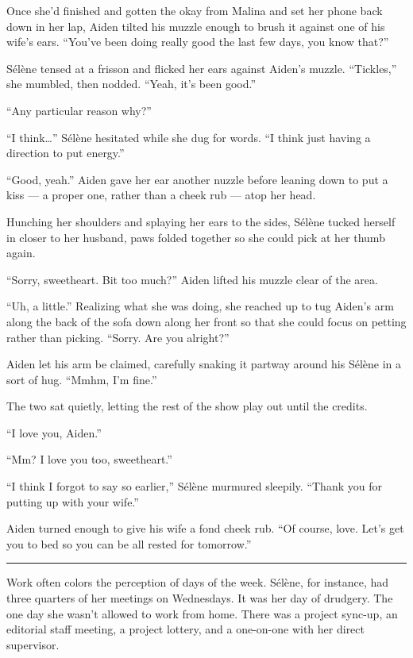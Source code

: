 Once she'd finished and gotten the okay from Malina and set her phone back down in her lap, Aiden tilted his muzzle enough to brush it against one of his wife's ears. ``You've been doing really good the last few days, you know that?''

Sélène tensed at a frisson and flicked her ears against Aiden's muzzle. ``Tickles,'' she mumbled, then nodded. ``Yeah, it's been good.''

``Any particular reason why?''

``I think\ldots{}'' Sélène hesitated while she dug for words. ``I think just having a direction to put energy.''

``Good, yeah.'' Aiden gave her ear another nuzzle before leaning down to put a kiss --- a proper one, rather than a cheek rub --- atop her head.

Hunching her shoulders and splaying her ears to the sides, Sélène tucked herself in closer to her husband, paws folded together so she could pick at her thumb again.

``Sorry, sweetheart. Bit too much?'' Aiden lifted his muzzle clear of the area.

``Uh, a little.'' Realizing what she was doing, she reached up to tug Aiden's arm along the back of the sofa down along her front so that she could focus on petting rather than picking. ``Sorry. Are you alright?''

Aiden let his arm be claimed, carefully snaking it partway around his Sélène in a sort of hug. ``Mmhm, I'm fine.''

The two sat quietly, letting the rest of the show play out until the credits.

``I love you, Aiden.''

``Mm? I love you too, sweetheart.''

``I think I forgot to say so earlier,'' Sélène murmured sleepily. ``Thank you for putting up with your wife.''

Aiden turned enough to give his wife a fond cheek rub. ``Of course, love. Let's get you to bed so you can be all rested for tomorrow.''

\begin{center}\rule{0.5\linewidth}{\linethickness}\end{center}

Work often colors the perception of days of the week. Sélène, for instance, had three quarters of her meetings on Wednesdays. It was her day of drudgery. The one day she wasn't allowed to work from home. There was a project sync-up, an editorial staff meeting, a project lottery, and a one-on-one with her direct supervisor.

